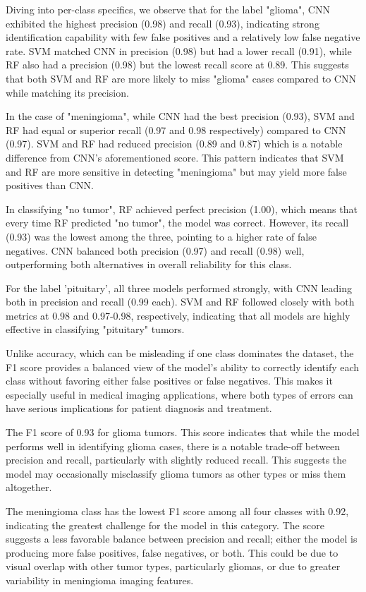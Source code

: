 \documentclass[conference]{IEEEtran}
\begin{document}
Diving into per-class specifics, we observe that for the label "glioma", CNN exhibited the highest precision (0.98) and recall (0.93), indicating strong identification capability with few false positives and a relatively low false negative rate. SVM matched CNN in precision (0.98) but had a lower recall (0.91), while RF also had a precision (0.98) but the lowest recall score at 0.89. This suggests that both SVM and RF are more likely to miss "glioma" cases compared to CNN while matching its precision.

In the case of "meningioma", while CNN had the best precision (0.93), SVM and RF had equal or superior recall (0.97 and 0.98 respectively) compared to CNN (0.97). SVM and RF had reduced precision (0.89 and 0.87) which is a notable difference from CNN's aforementioned score. This pattern indicates that SVM and RF are more sensitive in detecting "meningioma" but may yield more false positives than CNN.

In classifying "no tumor", RF achieved perfect precision (1.00), which means that every time RF predicted "no tumor", the model was correct. However, its recall (0.93) was the lowest among the three, pointing to a higher rate of false negatives. CNN balanced both precision (0.97) and recall (0.98) well, outperforming both alternatives in overall reliability for this class.

For the label 'pituitary', all three models performed strongly, with CNN leading both in precision and recall (0.99 each). SVM and RF followed closely with both metrics at 0.98 and 0.97-0.98, respectively, indicating that all models are highly effective in classifying "pituitary" tumors.

Unlike accuracy, which can be misleading if one class dominates the dataset, the F1 score provides a balanced view of the model's ability to correctly identify each class without favoring either false positives or false negatives. This makes it especially useful in medical imaging applications, where both types of errors can have serious implications for patient diagnosis and treatment.

The F1 score of 0.93 for glioma tumors. This score indicates that while the model performs well in identifying glioma cases, there is a notable trade-off between precision and recall, particularly with slightly reduced recall. This suggests the model may occasionally misclassify glioma tumors as other types or miss them altogether.

The meningioma class has the lowest F1 score among all four classes with 0.92, indicating the greatest challenge for the model in this category. The score suggests a less favorable balance between precision and recall; either the model is producing more false positives, false negatives, or both. This could be due to visual overlap with other tumor types, particularly gliomas, or due to greater variability in meningioma imaging features. 
\end{document}
